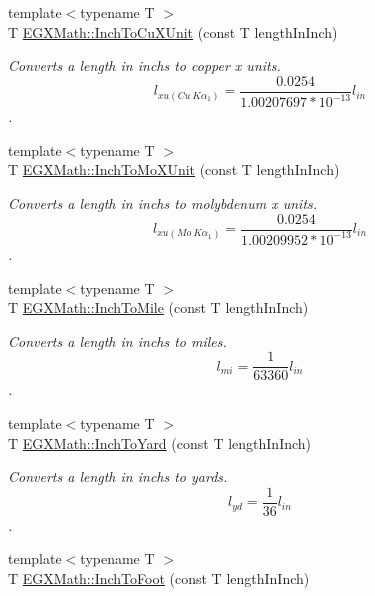 \begin{DoxyCompactItemize}
{\footnotesize template$<$typename T $>$ }\\T \mbox{\hyperlink{group___e_g_x_math-_conversions-_length_conversions-_imperial-_inch-_non-_s_i_ga90455aa8e1aaf26567c2b11fc24730c9}{E\+G\+X\+Math\+::\+Inch\+To\+Cu\+X\+Unit}} (const T length\+In\+Inch)
\begin{DoxyCompactList}\small\item\em Converts a length in inchs to copper x units. \[ l_{xu(Cu\ K\alpha_1)}=\frac{0.0254}{1.00207697*10^{-13}} l_{in}\]. \end{DoxyCompactList}\item 
{\footnotesize template$<$typename T $>$ }\\T \mbox{\hyperlink{group___e_g_x_math-_conversions-_length_conversions-_imperial-_inch-_non-_s_i_ga938a029b99c57c1b765ebf23e82dee6e}{E\+G\+X\+Math\+::\+Inch\+To\+Mo\+X\+Unit}} (const T length\+In\+Inch)
\begin{DoxyCompactList}\small\item\em Converts a length in inchs to molybdenum x units. \[ l_{xu(Mo\ K\alpha_1)}=\frac{0.0254}{1.00209952*10^{-13}} l_{in}\]. \end{DoxyCompactList}\item 
{\footnotesize template$<$typename T $>$ }\\T \mbox{\hyperlink{group___e_g_x_math-_conversions-_length_conversions-_imperial-_inch-_imperial_gabd202023ddba57d2cf3f7a142aa62bf8}{E\+G\+X\+Math\+::\+Inch\+To\+Mile}} (const T length\+In\+Inch)
\begin{DoxyCompactList}\small\item\em Converts a length in inchs to miles. \[ l_{mi}=\frac{1}{63360} l_{in} \]. \end{DoxyCompactList}\item 
{\footnotesize template$<$typename T $>$ }\\T \mbox{\hyperlink{group___e_g_x_math-_conversions-_length_conversions-_imperial-_inch-_imperial_gab2785bf628009109ea63c917397834fb}{E\+G\+X\+Math\+::\+Inch\+To\+Yard}} (const T length\+In\+Inch)
\begin{DoxyCompactList}\small\item\em Converts a length in inchs to yards. \[ l_{yd}= \frac{1}{36} l_{in} \]. \end{DoxyCompactList}\item 
{\footnotesize template$<$typename T $>$ }\\T \mbox{\hyperlink{group___e_g_x_math-_conversions-_length_conversions-_imperial-_inch-_imperial_gafb7c73e11f7d4c0c71dd62ee4a02267d}{E\+G\+X\+Math\+::\+Inch\+To\+Foot}} (const T length\+In\+Inch)

\end{DoxyCompactItemize}
